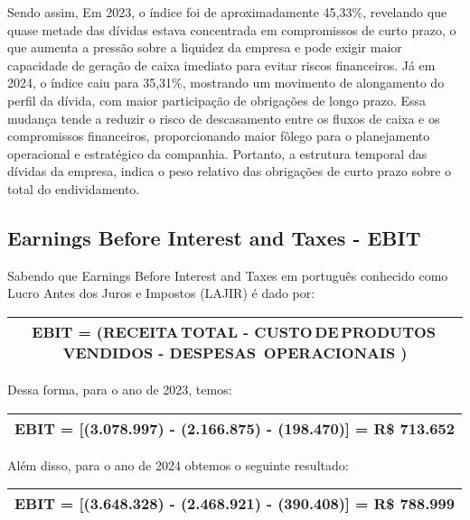 \documentclass[1pt,a4paper]{article}
\begin{document}
	Sendo assim, Em 2023, o índice foi de aproximadamente 45,33\%, revelando que quase metade das dívidas estava concentrada em compromissos de curto prazo, o que aumenta a pressão sobre a liquidez da empresa e pode exigir maior capacidade de geração de caixa imediato para evitar riscos financeiros. Já em 2024, o índice caiu para 35,31\%, mostrando um movimento de alongamento do perfil da dívida, com maior participação de obrigações de longo prazo. Essa mudança tende a reduzir o risco de descasamento entre os fluxos de caixa e os compromissos financeiros, proporcionando maior fôlego para o planejamento operacional e estratégico da companhia. Portanto, a estrutura temporal das dívidas da empresa, indica o peso relativo das obrigações de curto prazo sobre o total do endividamento.
	
	\subsection{Earnings Before Interest and Taxes - EBIT}
	
	\hspace*{1.5cm} Sabendo que Earnings Before Interest and Taxes em português conhecido como Lucro Antes dos Juros e Impostos (LAJIR) é dado por:
	
	\begin{center}
		\begin{tabular}{|c|}
			\hline
			EBIT = (RECEITA\,TOTAL - CUSTO\,DE\,PRODUTOS\,VENDIDOS - DESPESAS \,OPERACIONAIS )\\
			\hline
		\end{tabular}
	\end{center}
	Dessa forma, para o ano de 2023, temos:
		
	\begin{center}
		\begin{tabular}{|c|}
			\hline
			EBIT = [(3.078.997) - (2.166.875) - (198.470)] =  R\$ 713.652 \\
			\hline
		\end{tabular}
	\end{center}
	Além disso, para o ano de 2024 obtemos o seguinte resultado:
		
	\begin{center}
		\begin{tabular}{|c|}
			\hline
			EBIT = [(3.648.328) - (2.468.921) - (390.408)] =  R\$ 788.999 \\
			\hline
		\end{tabular}
	\end{center}
	
\end{document}
